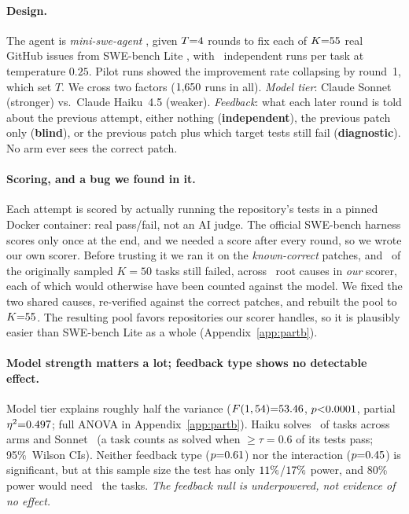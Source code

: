 \documentclass{article}
\theoremstyle{remark}
\theoremstyle{plain}
\begin{document}
\paragraph{Design.} The agent is \emph{mini-swe-agent} \citep{yang2024sweagent}, given $T{=}4$ rounds to fix each of $K{=}55$ real GitHub issues from SWE-bench Lite \citep{jimenez2023swe}, with \statPBSeeds\ independent runs per task at temperature $0.25$. Pilot runs showed the improvement rate collapsing by round~1, which set $T$. We cross two factors ($1{,}650$ runs in all). \emph{Model tier}: Claude Sonnet (stronger) vs.\ Claude Haiku~4.5 (weaker). \emph{Feedback}: what each later round is told about the previous attempt, either nothing (\textbf{independent}), the previous patch only (\textbf{blind}), or the previous patch plus which target tests still fail (\textbf{diagnostic}). No arm ever sees the correct patch.

\paragraph{Scoring, and a bug we found in it.} Each attempt is scored by actually running the repository's tests in a pinned Docker container: real pass/fail, not an AI judge. The official SWE-bench harness scores only once at the end, and we needed a score after every round, so we wrote our own scorer. Before trusting it we ran it on the \emph{known-correct} patches, and \statPBAuditFailN\ of the originally sampled $K{=}50$ tasks still failed, across \statPBAuditRootCauses\ root causes in \emph{our} scorer, each of which would otherwise have been counted against the model. We fixed the two shared causes, re-verified against the correct patches, and rebuilt the pool to $K{=}55$. The resulting pool favors repositories our scorer handles, so it is plausibly easier than SWE-bench Lite as a whole (Appendix~\ref{app:partb}).

\paragraph{Model strength matters a lot; feedback type shows no detectable effect.} Model tier explains roughly half the variance ($F(1, 54){=}53.46$, $p{<}0.0001$, partial $\eta^2{=}0.497$; full ANOVA in Appendix~\ref{app:partb}). Haiku solves \statPBHaikuSolveRange\ of tasks across arms and Sonnet \statPBSonnetSolveRange\ (a task counts as solved when $\ge\tau{=}0.6$ of its tests pass; 95\%~Wilson CIs). Neither feedback type ($p{=}0.61$) nor the interaction ($p{=}0.45$) is significant, but at this sample size the test has only $11\%$/$17\%$ power, and 80\% power would need \statPBPowerMultiple\ the tasks. \emph{The feedback null is underpowered, not evidence of no effect.}
\end{document}
